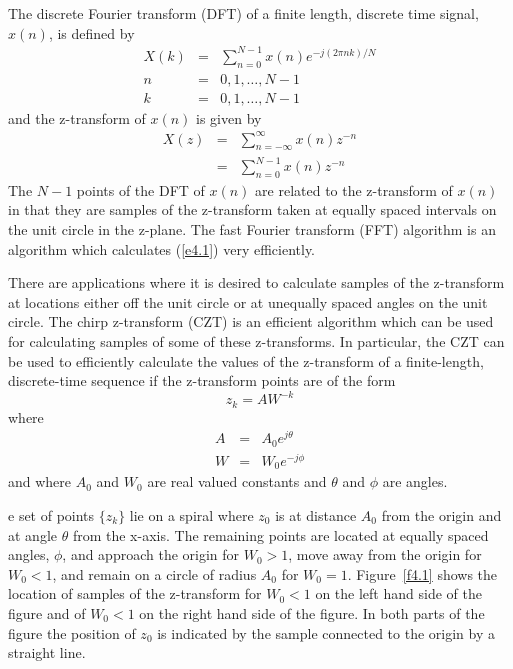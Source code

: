 	The discrete Fourier transform (DFT) of a finite length,
discrete time signal, $x(n)$, is defined by
%
\begin{eqnarray}
X(k) &=& \sum_{n=0}^{N-1}x(n)e^{-j(2\pi nk)/N}\\
n&=&0,1,\ldots,N-1\nonumber\\
k&=&0,1,\ldots,N-1\nonumber
\label{e4.1}
\end{eqnarray}
%
and the z-transform of $x(n)$ is given by
%
\begin{eqnarray}
X(z) &=& \sum_{n=-\infty}^{\infty}x(n)z^{-n}\nonumber\\
     &=& \sum_{n=0}^{N-1}x(n)z^{-n}
\label{e4.2}
\end{eqnarray}
%
The $N-1$ points of the DFT
of $x(n)$ are related to the z-transform of $x(n)$ in that
they are samples of the z-transform taken at equally spaced
intervals on the unit circle in the z-plane.
The fast Fourier transform (FFT) algorithm is an algorithm
which calculates (\ref{e4.1}) very efficiently.

	There are applications \cite{czt} where it is desired to calculate
samples of the z-transform at locations either off the unit circle or at
unequally spaced angles on the unit circle.  The chirp
z-transform (CZT) is an efficient algorithm which can be used
for calculating samples of some of these z-transforms.  In particular,
the CZT can be used to efficiently calculate the values of the
z-transform of a finite-length, discrete-time sequence if the
z-transform points are of the form
%
\begin{equation}
z_k = AW^{-k}
\label{e4.3a}
\end{equation}
%
where
%
\begin{eqnarray}
A   &=& A_0e^{j\theta}\nonumber\\
W   &=& W_0e^{-j\phi}
\label{e4.3}
\end{eqnarray}
%
and where $A_0$ and $W_0$ are real valued constants and $\theta$ and $\phi$
are angles.
%

e set of points $\{z_k\}$ lie on a spiral where
$z_0$ is at distance $A_0$ from the origin and at angle
$\theta$ from the x-axis.  The remaining points are located
at equally spaced angles, $\phi$, and approach the origin for
$W_0>1$, move away from the origin for $W_0<1$, and remain
on a circle of radius $A_0$ for $W_0=1$.  Figure~\ref{f4.1}
shows the location of samples of the z-transform for $W_0< 1$
on the left hand side of the figure and of
$W_0<1$ on the right hand side of the figure. In both parts of the
figure the position of 
$z_0$ is indicated by the sample connected to the origin by a straight
line.
